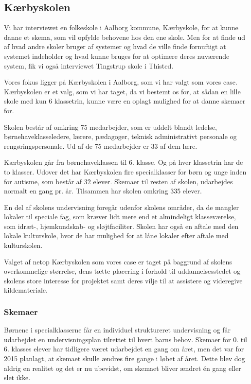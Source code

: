 \subsection{Kærbyskolen}
\label{Kaerbyskolen}
Vi har interviewet en folkeskole i Aalborg kommune, Kærbyskole, for at kunne danne et skema, som vil opfylde behovene hos den ene skole. Men for at finde ud af hvad andre skoler bruger af systemer og hvad de ville finde fornuftigt at systemet indeholder og hvad kunne bruges for at optimere deres nuværende system, fik vi også interviewet Tingstrup skole i Thisted.

Vores fokus ligger på Kærbyskolen i Aalborg, som vi har valgt som vores case. Kærbyskolen er et valg, som vi har taget, da vi bestemt os for, at sådan en lille skole med kun 6 klassetrin, kunne være en oplagt mulighed for at danne skemaer for.

Skolen består af omkring 75 medarbejder, som er uddelt blandt ledelse, børnehaveklasseledere, lærere, pædagoger, teknisk administrativt personale og rengøringspersonale. Ud af de 75 medarbejder er 33 af dem lære.

Kærbyskolen går fra børnehaveklassen til 6. klasse. Og på hver klassetrin har de to klasser. Udover det har Kærbyskolen fire specialklasser for børn og unge inden for autisme, som består af 32 elever. Skemaer til resten af skolen, udarbejdes normalt en gang pr. år. Tilsammen har skolen omkring 335 elever.

En del af skolens undervisning foregår udenfor skolens områder, da de mangler lokaler til speciale fag, som kræver lidt mere end et almindeligt klasseværelse, som idræt-, hjemkundskab- og sløjtfaciliter. Skolen har også en aftale med den lokale kulturskole, hvor de har mulighed for at låne lokaler efter aftale med kulturskolen.

Valget af netop Kærbyskolen som vores case er taget på baggrund af skolens overkommelige størrelse, dens tætte placering i forhold til uddannelsesstedet og skolens store interesse for projektet samt deres vilje til at assistere og videregive kildemateriale.

\subsubsection{Skemaer}
\label{Skemaer}
Børnene i specialklasserne får en individuel struktureret undervisning og får udarbejdet en undervisningsplan tilrettet til hvert barns behov\cite{j_klasser}.
Skemaer for 0. til 6. klasses elever har tidligere været udarbejdet en gang om året, men det var for 2015 planlagt, at skemaet skulle ændres fire gange i løbet af året. Dette blev dog aldrig en realitet og det er nu ubevidst, om skemaet bliver ændret én gang eller slet ikke.

